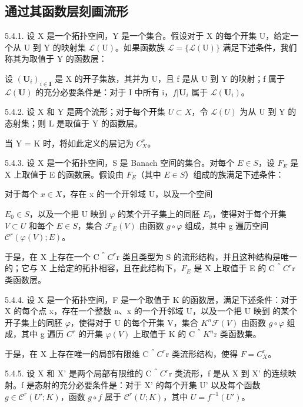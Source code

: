\subsection{通过其函数层刻画流形}

5.4.1. 设 X 是一个拓扑空间，Y 是一个集合。假设对于 X 的每个开集 U，给定一个从 U 到 Y 的映射集 \(\mathcal{L}(\mathrm{U})\)。如果函数族 \(\mathcal{L} = \{\mathcal{L}(\mathrm{U})\}\) 满足下述条件，我们称其为取值于 Y 的函数层：

设 \((\mathbf{U}_{i})_{i\in\mathbf{I}}\) 是 X 的开子集族，其并为 U，且 f 是从 U 到 Y 的映射；f 属于 \(\mathcal{L}(\mathbf{U})\) 的充分必要条件是：对于 I 中所有 i，\(f|\mathbf{U}_{i}\) 属于 \(\mathcal{L}(\mathbf{U}_{i})\)。

5.4.2. 设 X 和 Y 是两个流形；对于每个开集 \(U \subset X\)，令 \(\mathcal{L}(U)\) 为从 U 到 Y 的态射集；则 L 是取值于 Y 的函数层。

当 Y = K 时，将如此定义的层记为 \(C_{X}^{r}\)。

5.4.3. 设 X 是一个拓扑空间，S 是 Banach 空间的集合。对每个 \(E \in S\)，设 \(F_{E}\) 是 X 上取值于 E 的函数层。假设由 \(F_{E}\)（其中 \(E \in S\)）组成的族满足下述条件：

对于每个 \(x \in X\)，存在 x 的一个开邻域 U，以及一个空间

\(E_{0} \in S\)，以及一个把 U 映到 \(\varphi\) 的某个开子集上的同胚 \(E_{0}\)，使得对于每个开集 \(V \subset U\) 和每个 \(E \in S\)，集合 \(\mathcal{F}_{E}(V)\) 由函数 \(g \circ \varphi\) 组成，其中 g 遍历空间 \(\mathcal{C}^{r}(\varphi(V); E)\)。

于是，在 X 上存在一个 C＾\(C^{r}\)r 类且类型为 S 的流形结构，并且这种结构是唯一的；它与 X 上给定的拓扑相容，且在此结构下，\(F_{E}\) 是 X 上取值于 E 的 C＾\(C^{r}\)r 类函数层。

5.4.4. 设 X 是一个拓扑空间，F 是一个取值于 K 的函数层，满足下述条件：对于 X 的每个点 x，存在一个整数 n、x 的一个开邻域 U，以及一个把 U 映到  的某个开子集上的同胚 \(\varphi\)，使得对于 U 的每个开集 V，集合 \(K^{n}\)\(\mathcal{F}(V)\) 由函数 \(g \circ \varphi\) 组成，其中 g 遍历 \(C^{r}\) 的开集 \(\varphi(V)\) 上取值于 K 的 C＾\(K^{n}\)r 类函数集。

于是，在 X 上存在唯一的局部有限维 C＾\(C^{r}\)r 类流形结构，使得 \(F = C_{X}^{r}\)。

5.4.5. 设 X 和 X' 是两个局部有限维的 C＾\(C^{r}\)r 类流形，f 是从 X 到 X' 的连续映射。f 是态射的充分必要条件是：对于 X' 的每个开集 U' 以及每个函数 \(g \in \mathcal{C}^{r}(U'; K)\)，函数 \(g \circ f\) 属于 \(\mathcal{C}^{r}(U; K)\)，其中 \(U = f^{-1}(U')\)。

